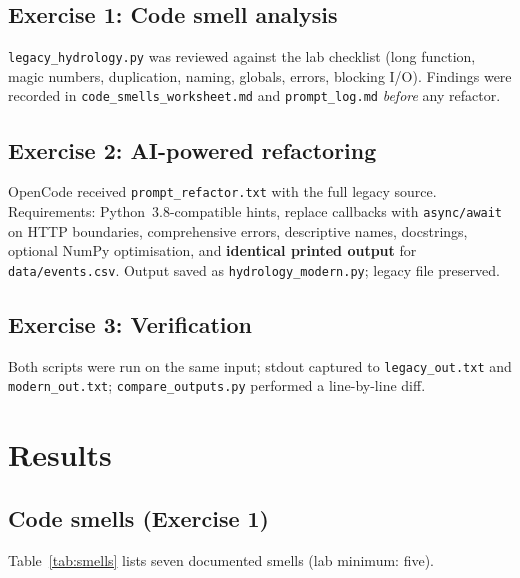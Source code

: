 \documentclass[11pt,a4paper]{article}
\begin{document}
\subsection{Exercise 1: Code smell analysis}
\texttt{legacy\_hydrology.py} was reviewed against the lab checklist (long function, magic numbers, duplication, naming, globals, errors, blocking I/O). Findings were recorded in \texttt{code\_smells\_worksheet.md} and \texttt{prompt\_log.md} \emph{before} any refactor.

\subsection{Exercise 2: AI-powered refactoring}
OpenCode received \texttt{prompt\_refactor.txt} with the full legacy source. Requirements: Python~3.8-compatible hints, replace callbacks with \texttt{async/await} on HTTP boundaries, comprehensive errors, descriptive names, docstrings, optional NumPy optimisation, and \textbf{identical printed output} for \texttt{data/events.csv}. Output saved as \texttt{hydrology\_modern.py}; legacy file preserved.

\subsection{Exercise 3: Verification}
Both scripts were run on the same input; stdout captured to \texttt{legacy\_out.txt} and \texttt{modern\_out.txt}; \texttt{compare\_outputs.py} performed a line-by-line diff.

\section{Results}

\subsection{Code smells (Exercise 1)}
Table~\ref{tab:smells} lists seven documented smells (lab minimum: five).
\end{document}
